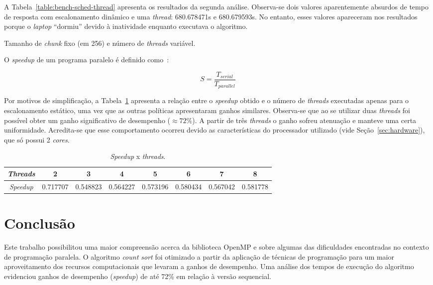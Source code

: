 \documentclass[12pt,a4paper]{article}
\begin{document}
A Tabela~\ref{table:bench-sched-thread} apresenta os resultados da segunda
análise. Observa-se dois valores aparentemente absurdos de tempo de resposta com
escalonamento dinâmico e uma \textit{thread}: 680.678471s e 680.679593s. No
entanto, esses valores apareceram nos resultados porque o \textit{laptop}
``dormiu'' devido à inatividade enquanto executava o algoritmo.

\begin{table}[h!]
\footnotesize
\centering
\caption{Tamanho de \textit{chunk} fixo (em 256) e número de \textit{threads}
variável.}
\label{table:bench-sched-thread}

\end{table}

O \textit{speedup} de um programa paralelo é definido como~\cite{main-book}:

$$S = \frac{T_{serial}}{T_{parallel}}$$

Por motivos de simplificação, a Tabela~\ref{table:speedup} apresenta a relação
entre o \textit{speedup} obtido e o número de \textit{threads} executadas apenas
para o escalonamento estático, uma vez que as outras políticas apresentaram
ganhos similares. Observa-se que ao se utilizar duas \textit{threads} foi
possível obter um ganho significativo de desempenho ($\approx 72\%$). A partir
de três \textit{threads} o ganho sofreu atenuação e manteve uma certa
uniformidade. Acredita-se que esse comportamento ocorreu devido as
características do processador utilizado (vide Seção~\ref{sec:hardware}), que só
possui 2
\textit{cores}.

\begin{table}[h!]
\footnotesize
\centering
\caption{\textit{Speedup} x \textit{threads}.}
\label{table:speedup}
\begin{tabular}{@{}cccccccc@{}}
\toprule
\textit{Threads} & 2 & 3 & 4 & 5 & 6 & 7 & 8 \\ \midrule
\textit{Speedup} & 0.717707 & 0.548823 & 0.564227 & 0.573196 & 0.580434 & 0.567042 & 0.581778 \\ \bottomrule 
\end{tabular}
\end{table}


\section{Conclusão}
Este trabalho possibilitou uma maior compreensão acerca da biblioteca OpenMP e
sobre algumas das dificuldades encontradas no contexto de programação paralela.
O algoritmo \textit{count sort} foi otimizado a partir da aplicação de técnicas
de programação para um maior aproveitamento dos recursos computacionais que
levaram a ganhos de desempenho. Uma análise dos tempos de execução do algoritmo
evidenciou ganhos de desempenho (\textit{speedup}) de até 72\% em relação à
versão sequencial.
\end{document}
